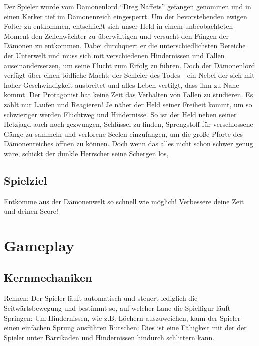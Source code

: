 \documentclass{article}
\begin{document}
Der Spieler wurde vom Dämonenlord “Dreg Naffets” gefangen genommen und in einen
Kerker tief im Dämonenreich eingesperrt. Um der bevorstehenden ewigen Folter zu
entkommen, entschließt sich unser Held in einem unbeobachteten Moment den
Zellenwächter zu überwältigen und versucht den Fängen der Dämonen zu entkommen. \newline
Dabei durchquert er die unterschiedlichsten Bereiche der Unterwelt und muss sich mit
verschiedenen Hindernissen und Fallen auseinandersetzen, um seine Flucht zum Erfolg zu führen. \newline
Doch der Dämonenlord verfügt über einen tödliche Macht: der Schleier des Todes - ein Nebel der sich mit hoher Geschwindigkeit ausbreitet und alles Leben vertilgt, dass ihm zu Nahe kommt. \newline
Der Protagonist hat keine Zeit das Verhalten von Fallen zu studieren. Es zählt nur Laufen und Reagieren! Je näher der Held seiner Freiheit kommt, um so schwieriger
werden Fluchtweg und Hindernisse.  \newline
So ist der Held neben seiner Hetzjagd auch noch
gezwungen, Schlüssel zu finden, Sprengstoff für verschlossene Gänge zu sammeln und verlorene Seelen einzufangen, um die große Pforte des Dämonenreiches öffnen zu können. \newline
Doch wenn das alles nicht schon schwer genug wäre, schickt der dunkle Herrscher seine
Schergen los,

\subsection{Spielziel}

Entkomme aus der Dämonenwelt so schnell wie möglich!
Verbessere deine Zeit und deinen Score!

\vspace{1cm}
\section{Gameplay}

\subsection{Kernmechaniken}

Rennen: Der Spieler läuft automatisch und steuert lediglich die Seitwärtsbewegung und
bestimmt so, auf welcher Lane die Spielfigur läuft \newline
Springen: Um Hindernissen, wie z.B. Löchern auszuweichen, kann der Spieler einen
einfachen Sprung ausführen \newline
Rutschen: Dies ist eine Fähigkeit mit der der Spieler unter Barrikaden und Hindernissen hindurch schlittern kann.
\end{document}
